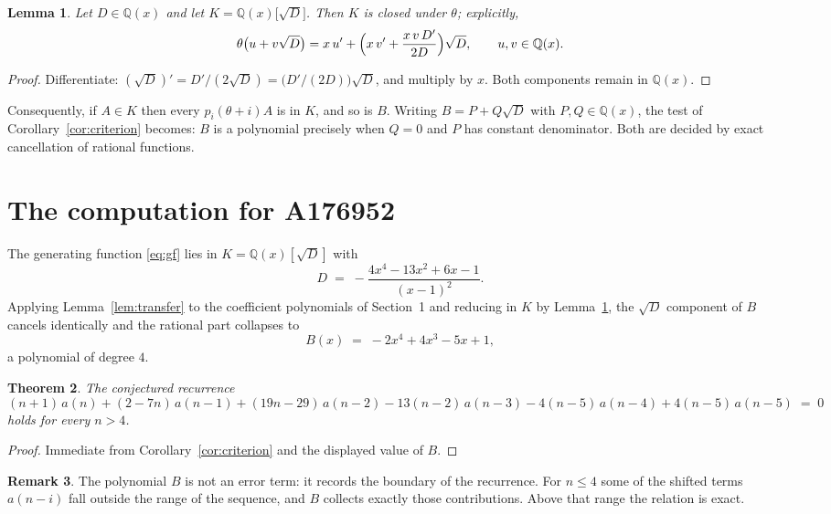 \documentclass[11pt,a4paper]{article}
\theoremstyle{plain}
\newtheorem{theorem}{Theorem}
\newtheorem{lemma}[theorem]{Lemma}
\theoremstyle{definition}
\newtheorem{remark}[theorem]{Remark}
\begin{document}
\begin{lemma}\label{lem:field}
Let $D\in\mathbb{Q}(x)$ and let $K=\mathbb{Q}(x)\bigl[\sqrt{D}\bigr]$. Then $K$ is closed
under $\theta$; explicitly,
\[
\theta\bigl(u+v\sqrt{D}\bigr)=x\,u'+\Bigl(x\,v'+\frac{x\,v\,D'}{2D}\Bigr)\sqrt{D},
\qquad u,v\in\mathbb{Q}(x).
\]
\end{lemma}

\begin{proof}
Differentiate: $(\sqrt{D})'=D'/(2\sqrt{D})=\bigl(D'/(2D)\bigr)\sqrt{D}$, and multiply by
$x$. Both components remain in $\mathbb{Q}(x)$.
\end{proof}

Consequently, if $A\in K$ then every $p_{i}(\theta+i)A$ is in $K$, and so is $B$. Writing
$B=P+Q\sqrt{D}$ with $P,Q\in\mathbb{Q}(x)$, the test of Corollary~\ref{cor:criterion}
becomes: $B$ is a polynomial precisely when $Q=0$ and $P$ has constant denominator. Both
are decided by exact cancellation of rational functions.

\section{The computation for A176952}

The generating function \eqref{eq:gf} lies in $K=\mathbb{Q}(x)[\sqrt{D}]$ with
\[
D \;=\; - \frac{4 x^{4} - 13 x^{2} + 6 x - 1}{\left(x - 1\right)^{2}} .
\]
Applying Lemma~\ref{lem:transfer} to the coefficient polynomials of Section~1 and reducing
in $K$ by Lemma~\ref{lem:field}, the $\sqrt{D}$ component of $B$ cancels identically and
the rational part collapses to
\[
B(x)\;=\;- 2 x^{4} + 4 x^{3} - 5 x + 1 ,
\]
a polynomial of degree $4$.

\begin{theorem}
The conjectured recurrence
\[
(n + 1)\,a(n) + (2 - 7 n)\,a(n-1) + (19 n - 29)\,a(n-2) -  13 \left(n - 2\right)\,a(n-3) -  4 \left(n - 5\right)\,a(n-4) + 4 \left(n - 5\right)\,a(n-5) \;=\;0
\]
holds for every $n>4$.
\end{theorem}

\begin{proof}
Immediate from Corollary~\ref{cor:criterion} and the displayed value of $B$.
\end{proof}

\begin{remark}
The polynomial $B$ is not an error term: it records the boundary of the recurrence. For
$n\le4$ some of the shifted terms $a(n-i)$ fall outside the range of the sequence,
and $B$ collects exactly those contributions. Above that range the relation is exact.
\end{remark}
\end{document}
